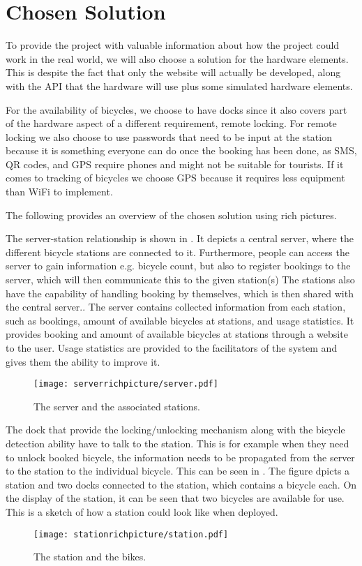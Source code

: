 \section{Chosen Solution}
To provide the project with valuable information about how the project could work in the real world, we will also choose a solution for the hardware elements.
This is despite the fact that only the website will actually be developed, along with the API that the hardware will use plus some simulated hardware elements.

For the availability of bicycles, we choose to have docks since it also covers part of the hardware aspect of a different requirement, remote locking.  
For remote locking we also choose to use passwords that need to be input at the station because it is something everyone can do once the booking has been done, as SMS, QR codes, and GPS require phones and might not be suitable for tourists.
If it comes to tracking of bicycles we choose GPS because it requires less equipment than WiFi to implement.

The following provides an overview of the chosen solution using rich pictures.

The server-station relationship is shown in .
It depicts a central server, where the different bicycle stations are connected to it.
Furthermore, people can access the server to gain information e.g. bicycle count, but also to register bookings to the server, which will then communicate this to the given station(s)
The stations also have the capability of handling booking by themselves, which is then shared with the central server..
The server contains collected information from each station, such as bookings, amount of available bicycles at stations, and usage statistics.
It provides booking and amount of available bicycles at stations through a website to the user. 
Usage statistics are provided to the facilitators of the system and gives them the ability to improve it. 

\begin{figure}[h]
\centering
\texttt{[image: serverrichpicture/server.pdf]}
\caption{The server and the associated stations.}
\label{fig:ServerRichPicture}
\end{figure}

The dock that provide the locking/unlocking mechanism along with the bicycle detection ability have to talk to the station. 
This is for example when they need to unlock booked bicycle, the information needs to be propagated from the server to the station to the individual bicycle.
This can be seen in .
The figure dpicts a station and two docks connected to the station, which contains a bicycle each. 
On the display of the station, it can be seen that two bicycles are available for use.
This is a sketch of how a station could look like when deployed.
\begin{figure}[h]
\centering
\texttt{[image: stationrichpicture/station.pdf]}
\caption{The station and the bikes.}
\label{fig:StationRichPicture}
\end{figure}